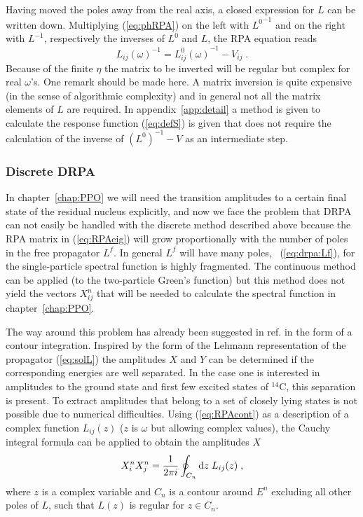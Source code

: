 Having moved the poles away from the real axis, a closed expression for 
 $L$ can be written down. Multiplying (\ref{eq:phRPA}) on the left with
 ${L^0}^{-1}$  and on the right with $L^{-1}$, respectively the 
inverses of $L^0$  and 
 $L$, the RPA equation reads
%
	\begin{equation}
		{L_{ij}(\omega)}^{-1}
	=
			{L^0_{ij}(\omega)}^{-1}
			-
			V_{ij}
	\label{eq:RPAcont}
	\;.
	\end{equation}
%
Because of the finite $\eta$ the matrix to be inverted will be regular but
complex  for real $\omega$'s.
One remark should be made here. A matrix inversion is quite expensive (in the 
sense of algorithmic complexity) and in 
general not all  the matrix elements of $L$ are required. 
In appendix~\ref{app:detail} a method is given to calculate the response
function (\ref{eq:defS}) is given that does not require the calculation of 
the inverse of $(L^0)^{-1} - V$ as an intermediate step.

\subsubsection{Discrete DRPA}
In chapter~\ref{chap:PPO} we will need the transition amplitudes to 
a certain final state of the residual nucleus explicitly, and now we 
face the problem that 
DRPA can not easily be handled with the discrete method described above
because the RPA matrix in (\ref{eq:RPAeig}) will grow proportionally with the
number of poles in the free propagator $L^f$. 
In general $L^f$ will have many poles, \cf~(\ref{eq:drpa:Lf}), 
for the single-particle spectral function is highly fragmented.
The continuous method can be applied (to the two-particle Green's function)
but this method does not yield the 
vectors $X^n_{ij}$ that will be needed to calculate the spectral function
in chapter~\ref{chap:PPO}.

The way around this problem has
already been suggested in ref.\cite{AEG93} in the form of a contour
integration. Inspired by the form of the Lehmann representation of
the propagator (\ref{eq:solL}) the amplitudes $X$ and $Y$
can be determined if the corresponding energies are well separated. In the case
one is interested in amplitudes to the ground state and first few excited states
of $^{14}$C, this separation is 
present. To extract amplitudes that belong to a set of closely lying states
is not possible due to numerical difficulties.
Using (\ref{eq:RPAcont})
as a description of a complex function $L_{ij}(z)$ ($z$ is $\omega$ but 
allowing complex values), the Cauchy 
integral formula can be applied to obtain the amplitudes $X$
%
	\begin{equation}
		X^n_{i} X^{n}_{j}
	=
		\frac{1}{2 \pi i}
		\oint_{C_n} {\rm d} z\;
		L_{ij}(z)
	\;,
	\label{eq:contour}
	\end{equation}
%
where $z$ is a complex variable and $C_n$ is a contour around $E^n$
excluding all other poles of $L$, such that $L(z)$ is regular for $z\in C_n$.
